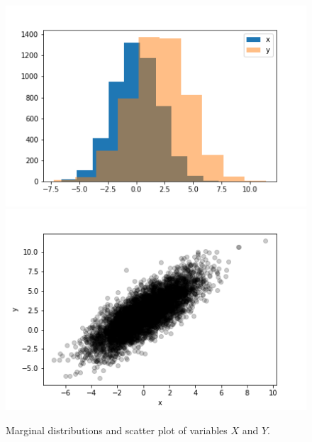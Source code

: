 \documentclass[BCOR=1mm, DIV=calc,10pt,
twoside=true,
twocolumn,
headings=normal]{scrartcl}
\begin{document}
\begin{figure}
\begin{center}
\includegraphics[scale=0.5]{figs/marginal} \includegraphics[scale=0.5]{figs/scatter}
\caption{\label{fig:scatter} Marginal distributions and scatter plot of variables $X$ and $Y$.}
\end{center}
\end{figure}
\end{document}

